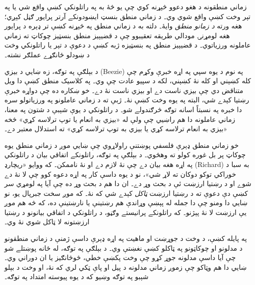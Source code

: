 \documentclass[../../../include/open-logic-section]{subfiles}
\begin{document}


زماني منطقونه د هغو دعوو څېړنه کوي چې يو څۀ به په راتلونکي کښې واقع شي يا
په تېر وخت کښې واقع شوي وي۔ د زماني منطق بنسټ ايښودونکے آرتر پرايور ګڼل
کېږي؛ هغه ورته \emph{د زمانو منطق} وايۀ۔ دلته به د زماني منطق په څېړنه کښې
تر ډېره د پرايور هغه لومړنۍ مودالي طريقه تعقيبوو چې د قضيېيز منطق بنسټيز
چوکاټ ته زماني عاملونه ورزياتوي۔ د قضيېيز منطق په بنسټيزه ژبه کښې د
دعوې د تېر يا راتلونکي وخت د ښودلو ځانګړے عملګر نشته۔

د بېلګې په توګه، زه ښايي د بيزي (Beezie) په نوم د يوه سپي په اړه خبرې
وکړم چې کله کښېني او کله نۀ کښېني، لکه د سپيو عادت چې وي۔ په کلاسيک
منطق کښې دا ويل متناقض دي چې بيزي ناست دے او بيزي ناست نۀ دے۔ خو ښکاره
ده چې دواړه خبرې رښتيا کېدے شي، البته په يوه وخت کښې نۀ۔ ژبې ته د زماني
عاملونو په ورزياتولو سره دا خبره په نسبتاً اسانه توګه څرګندولے شو۔ د راتلونکي د يوې شېبې د شتون په معنا، زماني عاملونه دا هم راښيي
چې ولې له «بيزي به انعام يا توپ ترلاسه کړي» څخه «بيزي به انعام
ترلاسه کړي يا بيزي به توپ ترلاسه کړي» ته استدلال معتبر دے۔

خو زماني منطق ډېرې فلسفي پوښتنې راولاړوي چې ښايي موږ د زماني منطق يوه
چوکاټ پر بل غوره کولو ته وهڅوي۔ د بېلګې په توګه، راتلونکے اتفاقي
بيان د راتلونکي په اړه هغه بيان دے چې نۀ لازم دے او نۀ ناممکن۔ که ووايو
«ريچارډ (Richard) به سبا د خوراکي توکو دوکان ته لاړ شي»، نو د يوه داسې
کار په اړه دعوه کوو چې لا نۀ دے شوے او د رښتيا ارزښت ئې د بحث وړ دے۔
ان دا هم د بحث وړ ده چې آيا په لومړي سر کښې دې دعوې ته د رښتيا ارزښت
\emph{ټاکل} کېدے شي که نۀ۔ که موږ سخت جبرپال يو، نو ښايي دا ومنو چې
دا جمله له پېښې وړاندې هم رښتينې يا نارښتينې ده، که څه هم موږ يې
ارزښت لا نۀ پېژنو۔ که راتلونکے پرانيستے وګڼو، د راتلونکي د اتفاقي
بيانونو د رښتيا ارزښتونه لا ټاکل شوي نۀ وي۔

په پايله کښې، د وخت د جوړښت او ماهيت په اړه ډېرې داسې ژمنې د زماني
منطقونو د مدلونو او چوکاټونو په ټاکلو کښې نغښتې وي۔ د بېلګې په توګه،
له ځانه پوښتلے شو چې آيا داسې مدلونه جوړ کړو چې وخت پکښې خطي، څوڅانګيز
يا ان دوراني وي۔ ښايي دا هم وټاکو چې زموږ زماني مدلونه د پيل او پاې
ټکي لري که نۀ، او وخت د بېلو شېبو په توګه وښيو که د يوه پيوسته امتداد
په توګه۔
\end{document}
